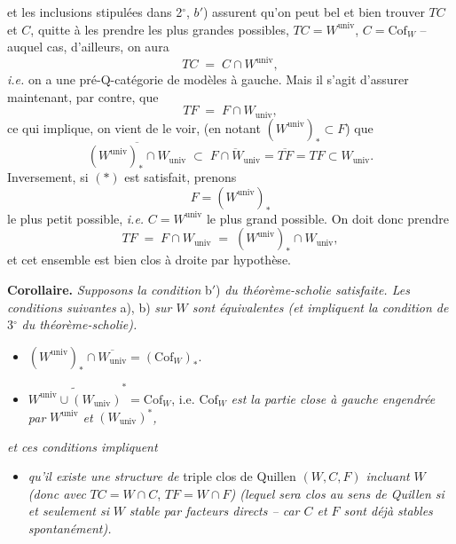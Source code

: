 \documentclass[11pt]{article}
\newcommand{\printedpage}[1]{\marginpar{\footnotesize p.~#1}}
\newcommand{\msp}[1]{\marginpar{\footnotesize [#1]}}
\newcommand{\univ}{\mathrm{univ}}
\newcommand{\Cof}{\mathrm{Cof}}
\newcommand{\cercle}[1]{\mbox{\tikz[baseline=(c.base)]\node[draw,circle,inner sep=1pt](c){#1};}}
\begin{document}
\printedpage{14}

\msp{page 24}
\noindent et les inclusions stipulées dans 2$^\circ$, $b'$) assurent qu'on peut bel et bien trouver $TC$ et $C$, quitte à les prendre les plus grandes possibles, $TC = W^{\univ}$, $C = \Cof_W$ -- auquel cas, d'ailleurs, on aura
\[
TC \;=\; C \cap W^{\univ},
\]
\textit{i.e.} on a une pré-Q-catégorie de modèles à gauche. Mais il s'agit d'assurer maintenant, par contre, que
\[
TF \;=\; F \cap W_{\univ},
\]
ce qui implique, on vient de le voir, (en notant $(W^{\univ})_* \subset F$) que
\[
\overline{(W^{\univ})_* \cap W_{\univ}} \;\subset\; \overline{F \cap W_{\univ}} = \overline{TF} = TF \subset W_{\univ}. \tag*{$(*)$}
\]
Inversement, si $(*)$ est satisfait, prenons
\[
F = (W^{\univ})_*
\]
le plus petit possible, \textit{i.e.} $C = W^{\univ}$ le plus grand possible. On doit donc prendre
\[
TF \;=\; F \cap W_{\univ} \;=\; (W^{\univ})_* \cap W_{\univ},
\]
et cet ensemble est bien clos à droite par hypothèse.

\textbf{Corollaire.} \textit{Supposons la condition} b$'$) \textit{du théorème-scholie satisfaite. Les conditions suivantes} a), b) \textit{sur $W$ sont équivalentes (et impliquent la condition de} 3$^\circ$ \textit{du théorème-scholie).}

\msp{page 25}
\begin{itemize}[leftmargin=3em]
\item[\cercle{a}] $(W^{\univ})_* \cap \overline{W_{\univ}} = (\Cof_W)_*$.

\item[\cercle{b}] $\widetilde{W^{\univ} \cup (W_{\univ})}^{*} = \Cof_W$, i.e. $\Cof_W$ \textit{est la partie close à gauche engendrée par} $W^{\univ}$ \textit{et} $(W_{\univ})^*$\textit{,} %
\end{itemize}

\noindent\textit{et ces conditions impliquent}

\begin{itemize}[leftmargin=3em]
\item[\cercle{c}] \textit{qu'il existe une structure de} triple clos de Quillen $(W, C, F)$ \textit{incluant} $W$ \textit{(donc avec} $TC = W \cap C$, $TF = W \cap F$\textit{) (lequel sera clos au sens de Quillen si et seulement si} $W$ \textit{stable par facteurs directs -- car $C$ et $F$ sont déjà stables spontanément).}
\end{itemize}
\end{document}
